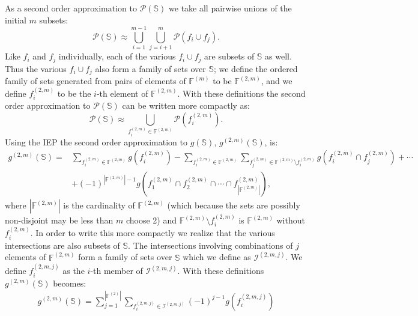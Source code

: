 \documentclass[11pt]{article}
\newcommand{\card}[1]{\left| #1\right|}
\newcommand{\gxn}[1]{g\left(#1\right)}
\newcommand{\pset}[1]{\mathcal{P}\left(#1\right)}
\newcommand{\fn}[1]{f^{(#1)}}
\newcommand{\ints}[1]{\mathcal{I}^{(#1)}}
\newcommand{\setf}{\mathbb{F}}
\newcommand{\setfn}[1]{\setf^{(#1)}}
\newcommand{\sets}{\mathbb{S}}
\newcommand{\gapprox}[1]{g^{(#1)}\left(\sets\right)}
\begin{document}
As a second order approximation to $\pset{\sets}$ we take all pairwise unions 
of the initial $m$ subsets:
\begin{equation}
	\pset{\sets} \approx \bigcup_{i=1}^{m-1}\bigcup_{j=i+1}^m\pset{f_i\cup f_j}.
\end{equation}
Like $f_i$ and $f_j$ individually, each of the various $f_i\cup f_j$ are subsets
of $\sets$ as well. Thus the various $f_i\cup f_j$ also form a family of sets 
over $\sets$; we define the ordered family of sets generated from pairs of 
elements of $\setfn{m}$ to be $\setfn{2,m}$, and we define $\fn{2,m}_i$ to be 
the $i$-th element of $\setfn{2,m}$. With these definitions the second order 
approximation to $\pset{\sets}$ can be written more compactly as:
\begin{equation}
	\pset{\sets} \approx \bigcup_{\fn{2,m}_i\in\setfn{2,m}}\pset{\fn{2,m}_i}.
\end{equation}
Using the IEP the second order approximation to $\gxn{\sets}$, $\gapprox{2,m}$, 
is:
\begin{align}
	\gapprox{2,m} =& \sum_{\fn{2,m}_i\in\setfn{2,m}} \gxn{\fn{2,m}_i} -
	    \sum_{\fn{2,m}_i\in\setfn{2,m}}
	    \sum_{\fn{2,m}_j\in\setfn{2,m}\setminus\fn{2,m}_i} 
	      \gxn{\fn{2,m}_i\cap \fn{2,m}_j} + \cdots \nonumber\\
	  & +\left(-1\right)^{\card{\setfn{2,m}}-1}
 	    \gxn{\fn{2,m}_1\cap
 	    	 \fn{2,m}_2\cap\cdots\cap
 	    	 \fn{2,m}_{\card{\setfn{2,m}}}},
\end{align}
where $\card{\setfn{2,m}}$ is the cardinality of $\setfn{2,m}$ (which because 
the sets are possibly non-disjoint may be less than $m$ choose 2) and 
$\setfn{2,m}\setminus{\fn{2,m}_i}$ is $\setfn{2,m}$ without $\fn{2,m}_i$. In 
order to write this more compactly we realize that the various intersections 
are also subsets of $\sets$. The intersections involving combinations of $j$ 
elements of $\setfn{2,m}$ form a family of sets over $\sets$ which we define as 
$\ints{2,m,j}$. We define $\fn{2,m,j}_i$ as the $i$-th member of $\ints{2,m,j}$.
With these definitions $\gapprox{2,m}$ becomes:
\begin{align}
	\gapprox{2,m} = \sum_{j=1}^{\card{\setfn{2}}}
	                \sum_{\fn{2,m,j}_i\in\ints{2,m,j}} 
	                \left(-1\right)^{j-1}\gxn{\fn{2,m,j}_i}
\end{align}
\end{document}
